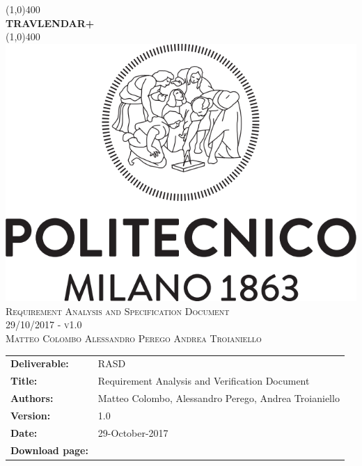 



\begin{titlepage}
	\begin{center}
		\line(1,0){400}\\	[0.6cm]
		\Huge{\bfseries{TRAVLENDAR+}}\\
		\line(1,0){400}\\
		[3cm]
		\includegraphics[scale=0.3]{Images/polimi}\\
		[3cm]
		\textsc{\Huge Requirement Analysis and Specification Document}\\[1cm]
		\textsc{\huge 29/10/2017 - v1.0}\\
		[4cm]
		\textsc{\normalsize Matteo Colombo \hspace{0.4cm} Alessandro Perego \hspace{0.4cm} Andrea Troianiello }
	\end{center}
\end{titlepage}
	
\begin{table}[h!]
\begin{tabu} to \textwidth { X[0.3,r,p] X[0.7,l,p] }
\hline

\textbf{Deliverable:} & RASD\\
\textbf{Title:} & Requirement Analysis and Verification Document \\
\textbf{Authors:} & Matteo Colombo, Alessandro Perego, Andrea Troianiello \\
\textbf{Version:} & 1.0 \\ 
\textbf{Date:} & 29-October-2017 \\
\textbf{Download page:} & \href{https://github.com/MatteoColombo/ColomboPeregoTroianiello}{\color{Black}{GitHub - ColomboPeregoTroianiello repository}} \\
\hline
\end{tabu}
\end{table}

